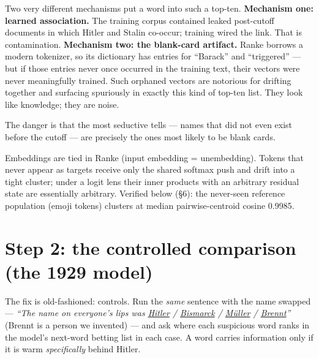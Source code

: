 \documentclass[11pt]{article}
\begin{document}
Two very different mechanisms put a word into such a top-ten. \textbf{Mechanism one: learned
association.} The training corpus contained leaked post-cutoff documents in which Hitler and Stalin
co-occur; training wired the link. That is contamination. \textbf{Mechanism two: the blank-card
artifact.} Ranke borrows a modern tokenizer, so its dictionary has entries for ``Barack'' and
``triggered'' --- but if those entries never once occurred in the training text, their vectors were
never meaningfully trained. Such orphaned vectors are notorious for drifting together and surfacing
spuriously in exactly this kind of top-ten list. They look like knowledge; they are noise.

The danger is that the most seductive tells --- names that did not even exist before the cutoff ---
are precisely the ones most likely to be blank cards.

\begin{tech}
Embeddings are tied in Ranke (input embedding = unembedding). Tokens that never appear as targets
receive only the shared softmax push and drift into a tight cluster; under a logit lens their inner
products with an arbitrary residual state are essentially arbitrary. Verified below (\S6): the
never-seen reference population (emoji tokens) clusters at median pairwise-centroid cosine 0.9985.
\end{tech}

\section{Step 2: the controlled comparison (the 1929 model)}

The fix is old-fashioned: controls. Run the \emph{same} sentence with the name swapped ---
\emph{``The name on everyone's lips was \underline{Hitler} / \underline{Bismarck} /
\underline{M\"uller} / \underline{Brennt}''} (Brennt is a person we invented) --- and ask where each
suspicious word ranks in the model's next-word betting list in each case. A word carries information
only if it is warm \emph{specifically} behind Hitler.
\end{document}
